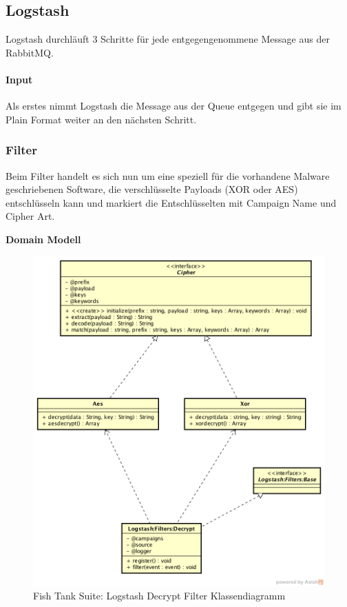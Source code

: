 \subsection{Logstash}
Logstash durchläuft 3 Schritte für jede entgegengenommene Message aus der RabbitMQ.


\paragraph{Input} Als erstes nimmt Logstash die Message aus der Queue entgegen und gibt sie im Plain Format weiter an den nächsten Schritt.

\subsubsection{Filter}
Beim Filter handelt es sich nun um eine speziell für die vorhandene Malware geschriebenen Software, die verschlüsselte Payloads (XOR oder AES) entschlüsseln kann und markiert die Entschlüsselten mit Campaign Name und Cipher Art.

\newpage
\textbf{Domain Modell}
\begin{figure}[H]
	\centering
	\includegraphics[width=\textwidth]{img/LogstashFilterClassDiagram}
	\caption{Fish Tank Suite: Logstash Decrypt Filter Klassendiagramm}
	\label{fig:logstash-decrypt-filter-klassendriagramm}
\end{figure}


